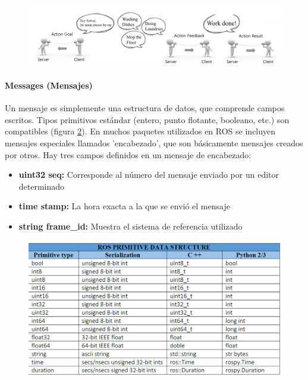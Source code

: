             \begin{figure}[htb]
                \centering
                \includegraphics[width=1.0\linewidth]{Main/Chapter3/Images3/n_s_a_12.png}
                \caption{}
                \label{f:Cap3_conceptos_12}
            \end{figure}   

               \newpage

            \paragraph{Messages (Mensajes)}
                Un mensaje es simplemente una estructura de datos, que comprende campos escritos. Tipos primitivos estándar (entero, punto flotante, booleano, etc.) son compatibles (figura \ref{f:Cap3_conceptos_13}). En muchos paquetes utilizados en ROS se incluyen mensajes especiales llamados 'encabezado', que son básicamente mensajes creados por otros. Hay tres campos definidos en un mensaje de encabezado: 
                
                \begin{itemize}
                    \item {\textbf{uint32 seq:} Corresponde al número del mensaje enviado por un editor determinado}
                    \item {\textbf{time stamp: } La hora exacta a la que se envió el mensaje}
                    \item {\textbf{string frame\_id:} Muestra el sistema de referencia utilizado}
                \end{itemize}

            \begin{figure}[htb]
                \centering
                \includegraphics[width=1.0\linewidth]{Main/Chapter3/Images3/n_s_a_13.png}
                \caption{}
                \label{f:Cap3_conceptos_13}
            \end{figure}   


